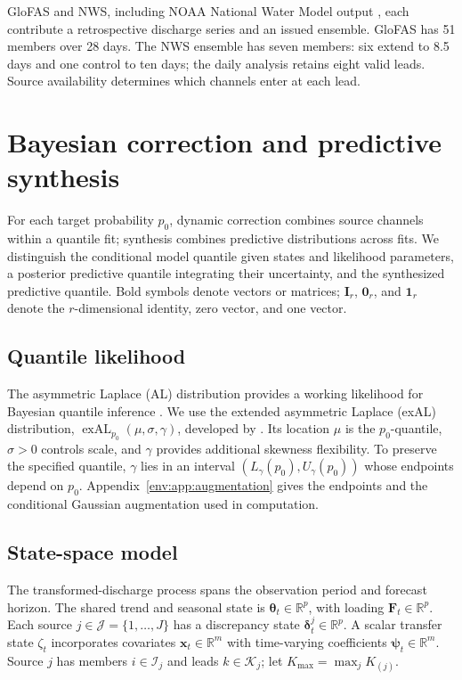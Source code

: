 GloFAS \citep{env-harrigan2020glofas} and NWS, including NOAA National Water
Model output \citep{env-cosgrove2024noaa}, each contribute a retrospective
discharge series and an issued ensemble. GloFAS has 51 members over 28 days.
The NWS ensemble has seven members: six extend to 8.5 days and one control to
ten days; the daily analysis retains eight valid leads. Source availability
determines which channels enter at each lead.

\section{Bayesian correction and predictive synthesis}
\label{env:sec:methodology}

For each target probability $p_0$, dynamic correction combines source channels
within a quantile fit; synthesis combines predictive distributions across
fits. We distinguish the conditional model quantile given states and
likelihood parameters, a posterior predictive quantile integrating their
uncertainty, and the synthesized predictive quantile. Bold symbols denote
vectors or matrices; $\mathbf I_r$, $\mathbf 0_r$, and $\mathbf 1_r$ denote
the $r$-dimensional identity, zero vector, and one vector.

\subsection{Quantile likelihood}
\label{env:subsec:exal}

The asymmetric Laplace (AL) distribution provides a working likelihood for
Bayesian quantile inference \citep{env-yu2001bayesian,
env-sriram2013theoretical}. We use the extended asymmetric Laplace (exAL)
distribution, $\operatorname{exAL}_{p_0}(\mu,\sigma,\gamma)$, developed by
\citet{exd-yan2025family}. Its location $\mu$ is the $p_0$-quantile,
$\sigma>0$ controls scale, and $\gamma$ provides additional skewness
flexibility. To preserve the specified quantile, $\gamma$ lies in an interval
$(L_\gamma(p_0),U_\gamma(p_0))$ whose endpoints depend on $p_0$.
Appendix~\ref{env:app:augmentation} gives the endpoints and the conditional
Gaussian augmentation used in computation.

\subsection{State-space model}
\label{env:subsec:fullmodel}

The transformed-discharge process spans the observation period and forecast
horizon. The shared trend and seasonal state is
$\boldsymbol\theta_t\in\mathbb R^p$, with loading
$\mathbf F_t\in\mathbb R^p$. Each source
$j\in\mathcal J=\{1,\ldots,J\}$ has a discrepancy state
$\boldsymbol\delta_t^j\in\mathbb R^p$. A scalar transfer state $\zeta_t$
incorporates covariates $\mathbf x_t\in\mathbb R^m$ with time-varying
coefficients $\boldsymbol\psi_t\in\mathbb R^m$. Source $j$ has members
$i\in\mathcal I_j$ and leads $k\in\mathcal K_j$; let
$K_{\max}=\max_j K_{(j)}$.

